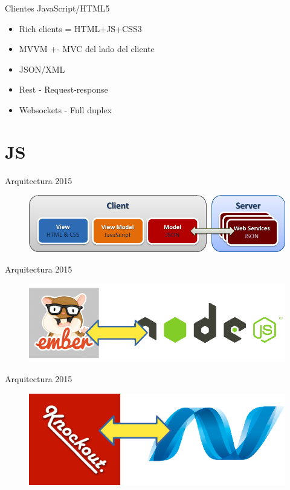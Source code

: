 \documentclass{beamer}
\begin{document}
\begin{frame}{Clientes JavaScript/HTML5}
		\begin{itemize}
			\item Rich clients = HTML+JS+CSS3
			\item MVVM +- MVC del lado del cliente
			\item JSON/XML
			\item Rest - Request-response
			\item Websockets - Full duplex
		\end{itemize}
\end{frame}

\section{JS}
\begin{frame}{Arquitectura 2015}
	\begin{figure}
\centering
\includegraphics[width=0.8\linewidth]{Images/arq2015b}
\end{figure}
\end{frame}

\begin{frame}{Arquitectura 2015}
	\begin{figure}
\centering
\includegraphics[width=0.8\linewidth]{Images/embernode.png}
\end{figure}
\end{frame}

\begin{frame}{Arquitectura 2015}
	\begin{figure}
\centering
\includegraphics[width=0.8\linewidth]{Images/knockoutnet.png}
\end{figure}
\end{frame}
\end{document}

